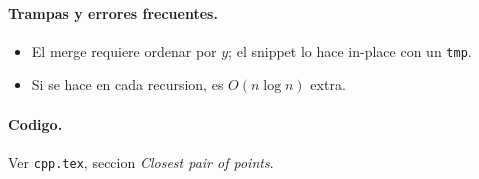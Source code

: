 \paragraph{Trampas y errores frecuentes.}
\begin{itemize}\setlength\itemsep{0pt}
	\item El merge requiere ordenar por $y$; el snippet lo hace in-place con un \texttt{tmp}.
	\item Si se hace en cada recursion, es $O(n \log n)$ extra.
\end{itemize}

\paragraph{Codigo.}
Ver \texttt{cpp.tex}, seccion \textit{Closest pair of points}.

\vspace{0.5em}
